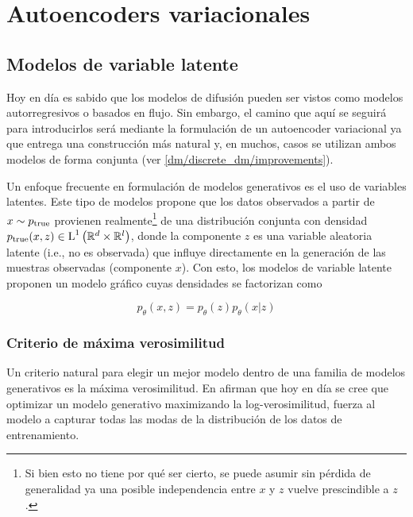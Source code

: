 
\section{Autoencoders variacionales}
\label{dm/vae}

\subsection{Modelos de variable latente}
\label{dm/vae/latent_models}

Hoy en día es sabido que los modelos de difusión pueden ser vistos como modelos autorregresivos o basados en flujo. Sin embargo, el camino que aquí se seguirá para introducirlos será mediante la formulación de un autoencoder variacional ya que entrega una construcción más natural y, en muchos, casos se utilizan ambos modelos de forma conjunta (ver \autoref{dm/discrete_dm/improvements}).

Un enfoque frecuente en formulación de modelos generativos es el uso de variables latentes. Este tipo de modelos propone que los datos observados a partir de $x\sim p_{\operatorname{true}}$ provienen realmente\footnote{Si bien esto no tiene por qué ser cierto, se puede asumir sin pérdida de generalidad ya una posible independencia entre $x$ y $z$ vuelve prescindible a $z$.} de una distribución conjunta con densidad $p_{\operatorname{true}}(x,z)\in\operatorname{L}^{1}\left(\mathbb{R}^d\times\mathbb{R}^l\right)$, donde la componente $z$ es una variable aleatoria latente (i.e., no es observada) que influye directamente en la generación de las muestras observadas (componente $x$). Con esto, los modelos de variable latente proponen un modelo gráfico cuyas densidades se factorizan como

\begin{equation}
    \label{eq:latent_model}
    p_\theta(x,z)=p_\theta(z)p_\theta(x|z)
\end{equation}

\subsubsection{Criterio de máxima verosimilitud}

Un criterio natural para elegir un mejor modelo dentro de una familia de modelos generativos es la máxima verosimilitud. En \cite{nichol2021improved} afirman que hoy en día se cree que optimizar un modelo generativo maximizando la log-verosimilitud, fuerza al modelo a capturar todas las modas de la distribución de los datos de entrenamiento.

